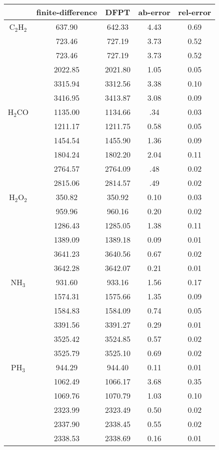 \documentclass[journal=jpca,manuscript=article]{achemso}
\begin{document}
\begin{table}
\scalebox{0.5}
{
\begin{tabular}{c| c c c c }
\hline \hline
       &finite-difference &    DFPT&  ab-error  & rel-error\\
\hline
C$_2$H$_2$ & 637.90 & 642.33 & 4.43 & 0.69 \\
 & 723.46 & 727.19 & 3.73 & 0.52 \\
 & 723.46 & 727.19 & 3.73 & 0.52 \\
 & 2022.85 & 2021.80 & 1.05 & 0.05 \\
 & 3315.94 & 3312.56 & 3.38 & 0.10 \\
 & 3416.95 & 3413.87 & 3.08 & 0.09 \\
H$_2$CO & 1135.00 & 1134.66 & .34 & 0.03 \\
 & 1211.17 & 1211.75 & 0.58 & 0.05 \\
 & 1454.54 & 1455.90 & 1.36 & 0.09 \\
 & 1804.24 & 1802.20 & 2.04 & 0.11 \\
 & 2764.57 & 2764.09 & .48 & 0.02 \\
 & 2815.06 & 2814.57 & .49 & 0.02 \\
H$_2$O$_2$ & 350.82 & 350.92 & 0.10 & 0.03 \\
 & 959.96 & 960.16 & 0.20 & 0.02 \\
 & 1286.43 & 1285.05 & 1.38 & 0.11 \\
 & 1389.09 & 1389.18 & 0.09 & 0.01 \\
 & 3641.23 & 3640.56 & 0.67 & 0.02 \\
 & 3642.28 & 3642.07 & 0.21 & 0.01 \\
NH$_3$ & 931.60 & 933.16 & 1.56 & 0.17 \\
 & 1574.31 & 1575.66 & 1.35 & 0.09 \\
 & 1584.83 & 1584.09 & 0.74 & 0.05 \\
 & 3391.56 & 3391.27 & 0.29 & 0.01 \\
 & 3525.42 & 3524.85 & 0.57 & 0.02 \\
 & 3525.79 & 3525.10 & 0.69 & 0.02 \\
PH$_3$ & 944.29 & 944.40 & 0.11 & 0.01 \\
 & 1062.49 & 1066.17 & 3.68 & 0.35 \\
 & 1069.76 & 1070.79 & 1.03 & 0.10 \\
 & 2323.99 & 2323.49 & 0.50 & 0.02 \\
 & 2337.90 & 2338.45 & 0.55 & 0.02 \\
 & 2338.53 & 2338.69 & 0.16 & 0.01 \\

\end{tabular}}
\end{table}
\end{document}
